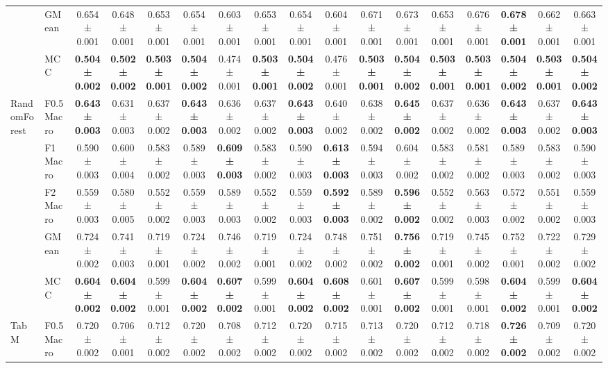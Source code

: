 \begin{table}[H]
{\begin{tabular}{llccccccccccccccc}
 & GMean & 0.654 ± 0.001 & 0.648 ± 0.001 & 0.653 ± 0.001 & 0.654 ± 0.001 & 0.603 ± 0.001 & 0.653 ± 0.001 & 0.654 ± 0.001 & 0.604 ± 0.001 & 0.671 ± 0.001 & 0.673 ± 0.001 & 0.653 ± 0.001 & 0.676 ± 0.001 & \textbf{0.678 ± 0.001} & 0.662 ± 0.001 & 0.663 ± 0.001 \\
 & MCC & \textbf{0.504 ± 0.002} & \textbf{0.502 ± 0.002} & \textbf{0.503 ± 0.001} & \textbf{0.504 ± 0.002} & 0.474 ± 0.001 & \textbf{0.503 ± 0.001} & \textbf{0.504 ± 0.002} & 0.476 ± 0.001 & \textbf{0.503 ± 0.001} & \textbf{0.504 ± 0.002} & \textbf{0.503 ± 0.001} & \textbf{0.503 ± 0.001} & \textbf{0.504 ± 0.002} & \textbf{0.503 ± 0.001} & \textbf{0.504 ± 0.002} \\
\cline{1-17}
\multirow[t]{5}{*}{RandomForest} & F0.5 Macro & \textbf{0.643 ± 0.003} & 0.631 ± 0.003 & 0.637 ± 0.002 & \textbf{0.643 ± 0.003} & 0.636 ± 0.002 & 0.637 ± 0.002 & \textbf{0.643 ± 0.003} & 0.640 ± 0.002 & 0.638 ± 0.002 & \textbf{0.645 ± 0.002} & 0.637 ± 0.002 & 0.636 ± 0.002 & \textbf{0.643 ± 0.003} & 0.637 ± 0.002 & \textbf{0.643 ± 0.003} \\
 & F1 Macro & 0.590 ± 0.003 & 0.600 ± 0.004 & 0.583 ± 0.002 & 0.589 ± 0.003 & \textbf{0.609 ± 0.003} & 0.583 ± 0.002 & 0.590 ± 0.003 & \textbf{0.613 ± 0.003} & 0.594 ± 0.003 & 0.604 ± 0.002 & 0.583 ± 0.002 & 0.581 ± 0.002 & 0.589 ± 0.003 & 0.583 ± 0.002 & 0.590 ± 0.003 \\
 & F2 Macro & 0.559 ± 0.003 & 0.580 ± 0.005 & 0.552 ± 0.002 & 0.559 ± 0.003 & 0.589 ± 0.003 & 0.552 ± 0.002 & 0.559 ± 0.003 & \textbf{0.592 ± 0.003} & 0.589 ± 0.002 & \textbf{0.596 ± 0.002} & 0.552 ± 0.002 & 0.563 ± 0.003 & 0.572 ± 0.002 & 0.551 ± 0.002 & 0.559 ± 0.003 \\
 & GMean & 0.724 ± 0.002 & 0.741 ± 0.003 & 0.719 ± 0.001 & 0.724 ± 0.002 & 0.746 ± 0.002 & 0.719 ± 0.001 & 0.724 ± 0.002 & 0.748 ± 0.002 & 0.751 ± 0.002 & \textbf{0.756 ± 0.002} & 0.719 ± 0.001 & 0.745 ± 0.002 & 0.752 ± 0.001 & 0.722 ± 0.002 & 0.729 ± 0.002 \\
 & MCC & \textbf{0.604 ± 0.002} & \textbf{0.604 ± 0.002} & 0.599 ± 0.001 & \textbf{0.604 ± 0.002} & \textbf{0.607 ± 0.002} & 0.599 ± 0.001 & \textbf{0.604 ± 0.002} & \textbf{0.608 ± 0.002} & 0.601 ± 0.001 & \textbf{0.607 ± 0.002} & 0.599 ± 0.001 & 0.598 ± 0.001 & \textbf{0.604 ± 0.002} & 0.599 ± 0.001 & \textbf{0.604 ± 0.002} \\
\cline{1-17}
\multirow[t]{5}{*}{TabM} & F0.5 Macro & 0.720 ± 0.002 & 0.706 ± 0.001 & 0.712 ± 0.002 & 0.720 ± 0.002 & 0.708 ± 0.002 & 0.712 ± 0.002 & 0.720 ± 0.002 & 0.715 ± 0.002 & 0.713 ± 0.002 & 0.720 ± 0.002 & 0.712 ± 0.002 & 0.718 ± 0.002 & \textbf{0.726 ± 0.002} & 0.709 ± 0.002 & 0.720 ± 0.002 \\

\end{tabular}}
\end{table}
